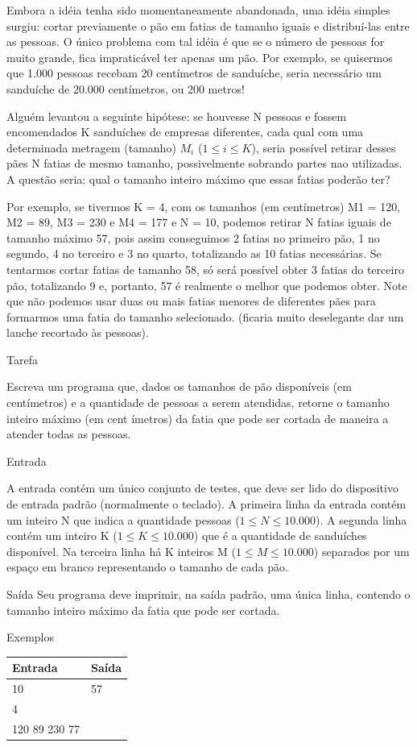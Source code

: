 \begin{enumerate}
Embora a idéia tenha sido momentaneamente abandonada, uma idéia simples surgiu: cortar previamente o pão em fatias de tamanho iguais e distribuí-las entre as pessoas. O único problema com tal idéia é que se o número de pessoas for muito grande, fica impraticável ter apenas um pão. Por exemplo, se quisermos que 1.000 pessoas recebam 20 centímetros de sanduíche, seria necessário um sanduíche de 20.000 centímetros, ou 200 metros!

Alguém levantou a seguinte hipótese: se houvesse N pessoas e fossem encomendados K sanduíches de empresas diferentes, cada qual com uma determinada metragem (tamanho) $M_i$ ($1 \leq i \leq K$), seria possível retirar desses pães N fatias de mesmo tamanho, possivelmente sobrando partes nao utilizadas. A questão seria: qual o tamanho inteiro máximo que essas fatias poderão ter?

Por exemplo, se tivermos K = 4, com os tamanhos (em centímetros) M1 = 120, M2 = 89, M3 = 230 e M4 = 177 e N = 10, podemos retirar N fatias iguais de tamanho máximo 57, pois assim conseguimos 2 fatias no primeiro pão, 1 no segundo, 4 no terceiro e 3 no quarto, totalizando as 10 fatias necessárias. Se tentarmos cortar fatias de tamanho 58, só será possível obter 3 fatias do terceiro pão, totalizando 9 e, portanto, 57 é realmente o melhor que podemos obter. Note que não podemos usar duas ou mais fatias menores de diferentes pães para formarmos uma fatia do tamanho selecionado. (ficaria muito deselegante dar um lanche recortado às pessoas).

Tarefa

Escreva um programa que, dados os tamanhos de pão disponíveis (em centímetros) e a quantidade de pessoas a serem atendidas, retorne o tamanho inteiro máximo (em cent ímetros) da fatia que pode ser cortada de maneira a atender todas as pessoas.

Entrada

A entrada contém um único conjunto de testes, que deve ser lido do dispositivo de entrada padrão (normalmente o teclado). A primeira linha da entrada contém um inteiro N que indica a quantidade pessoas ($1 \leq N \leq 10.000$). A segunda linha contém um inteiro K ($1 \leq K \leq 10.000$) que é a quantidade de sanduíches disponível. Na terceira linha há K inteiros M ($1 \leq M \leq 10.000$) separados por um espaço em branco representando o tamanho de cada pão.

Saída Seu programa deve imprimir, na saída padrão, uma única linha, contendo o tamanho inteiro máximo da fatia que pode ser cortada.

Exemplos


\begin{tabular}{|l|l|}
\hline
Entrada & Saída\\
\hline
10                & 57\\      
4        &\\
120 89 230 77 & \\
\hline
\end{tabular}


    
\end{enumerate}
